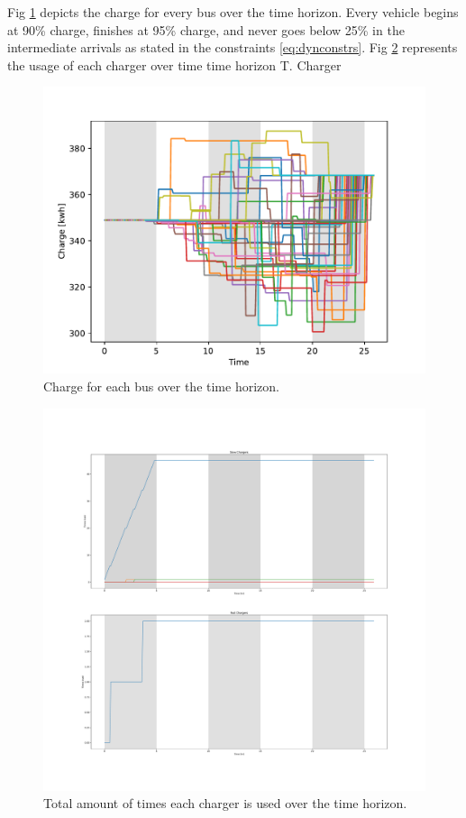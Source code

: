 \documentclass[letterpaper, 10pt, conference]{IEEEtran}
\begin{document}
Fig \ref{fig:charges} depicts the charge for every bus over the time horizon. Every vehicle begins at 90\% charge, finishes at 95\% charge, and never goes below 25\% in the intermediate arrivals as stated in the constraints \eqref{eq:dynconstrs}. Fig \ref{fig:usage} represents the usage of each charger over time time horizon T. Charger

\begin{figure}[ht]
	\centering
	\includegraphics[trim=0in 0in 0in 0in, width=\linewidth]{charges.pdf}
	\caption{Charge for each bus over the time horizon.}
	\label{fig:charges}
\end{figure}

\begin{figure}[ht]
	\centering
	\includegraphics[trim=0in 0in 0in 0in, width=\linewidth]{usage.pdf}
	\caption{Total amount of times each charger is used over the time horizon.}
	\label{fig:usage}
\end{figure}
\end{document}
